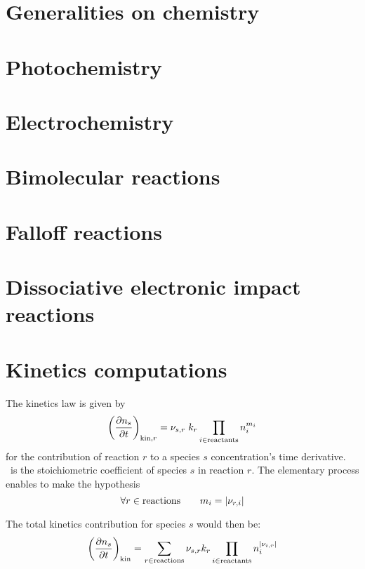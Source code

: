 \section{Generalities on chemistry}


\section{Photochemistry}


\section{Electrochemistry}


\section{Bimolecular reactions}
\label{Titan_bimol_sec}


\section{Falloff reactions}


\section{Dissociative electronic impact reactions}


\section{Kinetics computations}
The kinetics law is given by
\begin{equation}
\left(\frac{\partial n_s}{\partial t}\right)_{\text{kin},r} = {\nu_{s,r}}\; k_{r} \prod_{i\in\text{reactants}}n_i^{{m_{i}}}
\end{equation}
for the contribution of reaction $r$ to a species $s$ concentration's
time derivative. \ is the stoichiometric coefficient of species
$s$ in reaction $r$. The elementary process enables to make the hypothesis
\begin{equation}
\forall r \in \text{reactions}\qquad
{m_{i}} = |{\nu_{r,i}}|
\end{equation}

The total kinetics contribution for species $s$ would then be:
\begin{equation}
\left(\frac{\partial n_s}{\partial t}\right)_\text{kin} = \sum_{r\in \text{reactions}} {\nu_{s,r}} k_{r} \prod_{i\in\text{reactants}}n_i^{|{\nu_{i,r}}|}
\label{Titan:kinetics}
\end{equation}
